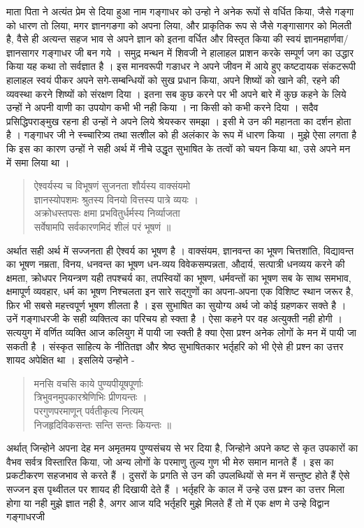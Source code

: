 माता पिता ने अत्यंत प्रेम से दिया हुआ नाम गङ्गाधर को उन्हो ने अनेक रूपों से वर्धित किया, जैसे गङ्गा को धारण तो लिया, मगर ज्ञानगङगा को अपना लिया,  और प्राकृतिक रूप से जैसे गङ्गासागर को मिलती है, वैसे ही अत्यन्त सहज भाव से अपने ज्ञान को इतना वर्धित और विस्तृत किया की स्वयं ज्ञानमहार्णवा/ज्ञानसागर गङ्गाधर जी बन गये । समुद्र मन्थन में शिवजी ने हालाहल प्राशन करके सम्पूर्ण जग का उद्धार किया यह कथा तो सर्वज्ञात है । इस मानवरूपी गङाधर ने अपने जीवन में आये हुए कष्टदायक संकटरूपी हालाहल स्वयं पीकर अपने सगे-सम्बन्धियों को सुख प्रधान किया, अपने  शिष्यों को खाने की, रहने की व्यवस्था करने शिष्यों को संरक्षण दिया । इतना सब कुछ करने पर भी अपने बारे में कुछ कहने के लिये उन्हों ने अपनी वाणी का उपयोग कभी भी नही किया । ना किसी को कभी करने दिया । सदैव प्रसिद्धिपराङ्मुख रहना ही उन्हों ने अपने लिये श्रेयस्कर समझा । इसी मे  उन की महानता का दर्शन होता है । गङ्गाधर जी ने स्च्चारित्र्य तथा सत्शील को ही अलंकार के रूप में धारण किया । मुझे ऐसा लगता है कि इस का कारण उन्हों ने सही अर्थ में नीचे उद्धृत सुभाषित के तत्वों को चयन किया था, उसे अपने मन में समा लिया था ।
\begin{verse}
ऐश्वर्यस्य च विभूषणं सुजनता शौर्यस्य वाक्संयमो \\
ज्ञानस्योपशमः श्रुतस्य विनयो वित्तस्य पात्रे व्ययः ।\\
अक्रोधस्तपसः क्षमा प्रभवितुर्धर्मस्य निर्व्याजता \\
सर्वेषामपि सर्वकारणमिदं शीलं परं भूषणं ॥
\end{verse}
अर्थात सही अर्थ में सज्जनता ही ऐश्वर्य का भूषण है । वाक्संयम, ज्ञानवन्त का भूषण चित्तशांति, विद्यावन्त का भूषण नम्रता, विनय, धनवन्त का भूषण धन-व्यय विवेकसम्पन्नता, औदार्य, सत्पात्री धनव्यय करने की क्षमता, क्रोधपर नियन्त्रण यही तपश्चर्य का, तपस्वियों का भूषण, धर्मवन्तों का भूषण सब के साथ समभाव, क्षमापूर्ण व्यवहार, धर्म का भूषण निश्चलता इन सारे सद्गुणों का अपना-अपना एक विशिष्ट स्थान जरूर है, फ़िर भी सबसे महत्त्वपूर्ण भूषण शीलता है । इस सुभाषित का सुयोग्य अर्थ जो कोई ग्रहणकर सक्ते है । उनें गङ्गाधरजी के सही व्यक्तित्व का परिचय हो स्क्ता है । ऐसा कहने पर वह अत्युक्ती नही होगी । सत्ययुग में वर्णित व्यक्ति आज कलियुग में पायी जा स्क्ती है क्या ऐसा प्रश्न अनेक लोगों के मन में पायी जा सकती है । संस्कृत साहित्य के नीतितज्ञ और श्रेष्ठ सुभाषितकार भर्तृहरि को भी ऐसे ही प्रश्न का उत्तर शायद अपेक्षित था । इसलिये उन्होने -
\begin{verse}
मनसि वचसि काये पुण्यपीयूषपूर्णाः \\
त्रिभुवनमुपकारश्रेणिभिः प्रीणयन्तः ।\\
परगुणपरमाणून् पर्वतीकृत्य नित्यम्\\
निजहृदिविकसन्तः सन्ति सन्तः कियन्तः ॥
\end{verse}
अर्थात् जिन्होने अपना देह मन अमृतमय पुण्यसंचय से भर दिया है, जिन्होने अपने कष्ट से कृत उपकारों का वैभव सर्वत्र विस्तारित किया, जो अन्य लोगों के परमाणु तुल्य गुण भी मेरु समान मानते हैं । इस का प्रकटीकरण सहजभाव से करते हैं । दुसरों के प्रगति से उन की उपलब्धियों से मन में सन्तुष्ट होते हैं ऐसे सज्जन इस पृथ्वीतल पर शायद ही दिखायी देते हैं ।  भर्तृहरि के काल में उन्हे उस प्रश्न का उत्तर मिला होगा या नही मुझे ज्ञात नही है, अगर आज यदि भर्तृहरि मुझे मिलते हैं  तो में एक क्षण मे उन्हे विद्वान गङ्गाधरजी 

